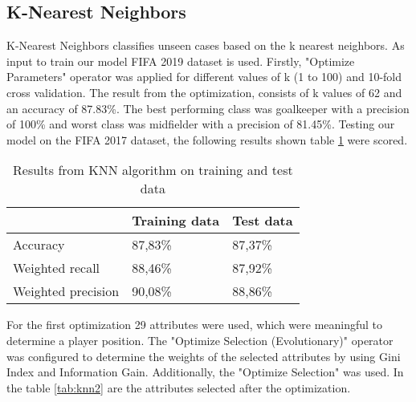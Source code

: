 \subsection{K-Nearest Neighbors}
\label{sec:KNN}
K-Nearest Neighbors classifies unseen cases based on the k nearest neighbors. As input to train our model FIFA 2019 dataset is used. Firstly, "Optimize Parameters" operator was applied for different values of k (1 to 100) and 10-fold cross validation. The result from the optimization, consists of k values of 62 and an accuracy of 87.83\%. The best performing class was goalkeeper with a precision of 100\% and worst class was midfielder with a precision of 81.45\%. Testing our model on the FIFA 2017 dataset, the following results shown table \ref{tab:knn} were scored.\\


\begin{table}[]
\centering
\begin{tabular}{@{}lll@{}}
\toprule
                   & Training data & Test data \\ \midrule
Accuracy           & 87,83\%       & 87,37\%   \\
Weighted recall    & 88,46\%       & 87,92\%   \\
Weighted precision & 90,08\%       & 88,86\%   \\ \bottomrule
\end{tabular}
\label{tab:knn}
\caption{Results from KNN algorithm on training and test data}
\end{table}


For the first optimization 29 attributes were used, which were meaningful to determine a player position.
The "Optimize Selection (Evolutionary)" operator was configured to determine the weights of the selected attributes by using Gini Index and Information Gain. Additionally, the "Optimize Selection" was used. In the table \ref{tab:knn2} are the attributes selected after the optimization.

